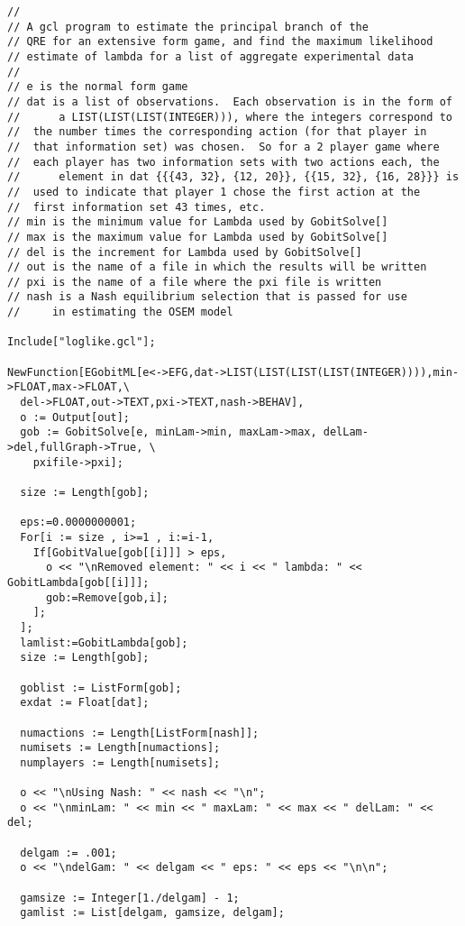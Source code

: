 \begin{verbatim}
//
// A gcl program to estimate the principal branch of the 
// QRE for an extensive form game, and find the maximum likelihood 
// estimate of lambda for a list of aggregate experimental data
// 
// e is the normal form game
// dat is a list of observations.  Each observation is in the form of  
//      a LIST(LIST(LIST(INTEGER))), where the integers correspond to
//	the number times the corresponding action (for that player in
//	that information set) was chosen.  So for a 2 player game where
//	each player has two information sets with two actions each, the 
//      element in dat {{{43, 32}, {12, 20}}, {{15, 32}, {16, 28}}} is 
//	used to indicate that player 1 chose the first action at the
//	first information set 43 times, etc.  
// min is the minimum value for Lambda used by GobitSolve[]
// max is the maximum value for Lambda used by GobitSolve[]
// del is the increment for Lambda used by GobitSolve[]
// out is the name of a file in which the results will be written
// pxi is the name of a file where the pxi file is written
// nash is a Nash equilibrium selection that is passed for use
//     in estimating the OSEM model 

Include["loglike.gcl"];

NewFunction[EGobitML[e<->EFG,dat->LIST(LIST(LIST(LIST(INTEGER)))),min->FLOAT,max->FLOAT,\
  del->FLOAT,out->TEXT,pxi->TEXT,nash->BEHAV],
  o := Output[out];
  gob := GobitSolve[e, minLam->min, maxLam->max, delLam->del,fullGraph->True, \
    pxifile->pxi];

  size := Length[gob];

  eps:=0.0000000001;
  For[i := size , i>=1 , i:=i-1,
    If[GobitValue[gob[[i]]] > eps, 
      o << "\nRemoved element: " << i << " lambda: " << GobitLambda[gob[[i]]];
      gob:=Remove[gob,i]; 
    ];
  ];
  lamlist:=GobitLambda[gob];
  size := Length[gob];

  goblist := ListForm[gob];
  exdat := Float[dat];

  numactions := Length[ListForm[nash]];
  numisets := Length[numactions];
  numplayers := Length[numisets];

  o << "\nUsing Nash: " << nash << "\n";
  o << "\nminLam: " << min << " maxLam: " << max << " delLam: " << del;

  delgam := .001;
  o << "\ndelGam: " << delgam << " eps: " << eps << "\n\n";

  gamsize := Integer[1./delgam] - 1;
  gamlist := List[delgam, gamsize, delgam];
  

\end{verbatim}
